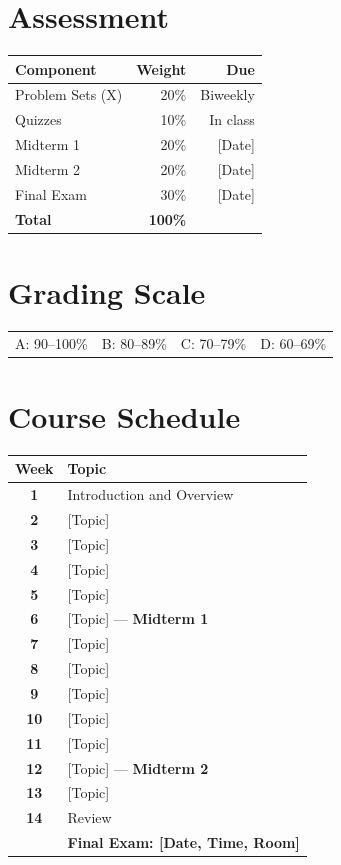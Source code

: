 \documentclass[11pt]{article}
\begin{document}
\section*{Assessment}

\begin{center}
\renewcommand{\arraystretch}{1.3}
\begin{tabular}{lrr}
  \toprule
  \textbf{Component}   & \textbf{Weight} & \textbf{Due} \\
  \midrule
  Problem Sets (X)     & 20\%            & Biweekly \\
  Quizzes              & 10\%            & In class \\
  Midterm 1            & 20\%            & [Date] \\
  Midterm 2            & 20\%            & [Date] \\
  Final Exam           & 30\%            & [Date] \\
  \midrule
  \textbf{Total}       & \textbf{100\%}  & \\
  \bottomrule
\end{tabular}
\end{center}

\section*{Grading Scale}

\begin{tabular}{llll}
  A: 90--100\% & B: 80--89\% & C: 70--79\% & D: 60--69\%
\end{tabular}

\section*{Course Schedule}

\renewcommand{\arraystretch}{1.3}
\begin{tabular}{>{\bfseries}cl}
  \toprule
  Week & Topic \\
  \midrule
  1  & Introduction and Overview \\
  2  & [Topic] \\
  3  & [Topic] \\
  4  & [Topic] \\
  5  & [Topic] \\
  6  & [Topic] --- \textbf{Midterm 1} \\
  7  & [Topic] \\
  8  & [Topic] \\
  9  & [Topic] \\
  10 & [Topic] \\
  11 & [Topic] \\
  12 & [Topic] --- \textbf{Midterm 2} \\
  13 & [Topic] \\
  14 & Review \\
     & \textbf{Final Exam: [Date, Time, Room]} \\
  \bottomrule
\end{tabular}
\end{document}
